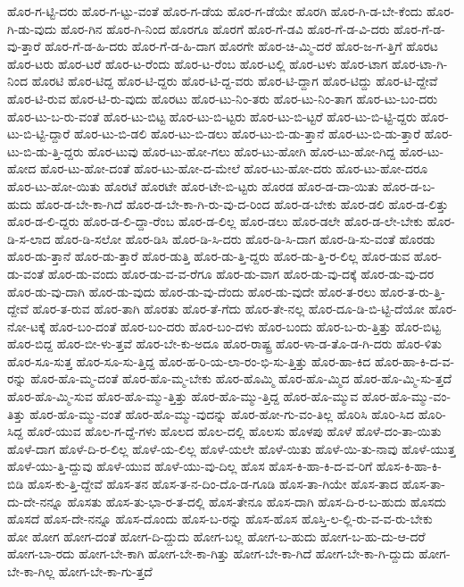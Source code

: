 {ಹೊರ-ಗ-ಟ್ಟಿ-ದರು
ಹೊರ-ಗ-ಟ್ಟು-ವಂತೆ
ಹೊರ-ಗ-ಡೆಯ
ಹೊರ-ಗ-ಡೆಯೇ
ಹೊರಗಿ
ಹೊರ-ಗಿ-ಡ-ಬೇ-ಕೆಂದು
ಹೊರ-ಗಿ-ಡು-ವುದು
ಹೊರ-ಗಿನ
ಹೊರ-ಗಿ-ನಿಂದ
ಹೊರಗೂ
ಹೊರಗೆ
ಹೊರ-ಗೆ-ಡವಿ
ಹೊರ-ಗೆ-ಡ-ವಿ-ದರು
ಹೊರ-ಗೆ-ಡ-ವು-ತ್ತಾರೆ
ಹೊರ-ಗೆ-ಡ-ಹಿ-ದರು
ಹೊರ-ಗೆ-ಡ-ಹಿ-ದಾಗ
ಹೊರಗೇ
ಹೊರ-ಚಿ-ಮ್ಮಿ-ದರೆ
ಹೊರ-ಜ-ಗ-ತ್ತಿಗೆ
ಹೊರಟ
ಹೊರ-ಟರು
ಹೊರ-ಟರೆ
ಹೊರ-ಟ-ರೆಂದು
ಹೊರ-ಟ-ರೆಂಬ
ಹೊರ-ಟಲ್ಲಿ
ಹೊರ-ಟಳು
ಹೊರ-ಟಾಗ
ಹೊರ-ಟಾ-ಗಿ-ನಿಂದ
ಹೊರಟಿ
ಹೊರ-ಟಿದ್ದ
ಹೊರ-ಟಿ-ದ್ದರು
ಹೊರ-ಟಿ-ದ್ದ-ವರು
ಹೊರ-ಟಿ-ದ್ದಾಗ
ಹೊರ-ಟಿದ್ದು
ಹೊರ-ಟಿ-ದ್ದೇವೆ
ಹೊರ-ಟಿ-ರುವ
ಹೊರ-ಟಿ-ರು-ವುದು
ಹೊರಟು
ಹೊರ-ಟು-ನಿಂ-ತರು
ಹೊರ-ಟು-ನಿಂ-ತಾಗ
ಹೊರ-ಟು-ಬಂ-ದರು
ಹೊರ-ಟು-ಬ-ರು-ವಂತೆ
ಹೊರ-ಟು-ಬಿಟ್ಟ
ಹೊರ-ಟು-ಬಿ-ಟ್ಟರು
ಹೊರ-ಟು-ಬಿ-ಟ್ಟರೆ
ಹೊರ-ಟು-ಬಿ-ಟ್ಟಿ-ದ್ದರು
ಹೊರ-ಟು-ಬಿ-ಟ್ಟಿ-ದ್ದಾರೆ
ಹೊರ-ಟು-ಬಿ-ಡಲಿ
ಹೊರ-ಟು-ಬಿ-ಡಲು
ಹೊರ-ಟು-ಬಿ-ಡು-ತ್ತಾನೆ
ಹೊರ-ಟು-ಬಿ-ಡು-ತ್ತಾರೆ
ಹೊರ-ಟು-ಬಿ-ಡು-ತ್ತಿ-ದ್ದರು
ಹೊರ-ಟುವು
ಹೊರ-ಟು-ಹೋ-ಗಲು
ಹೊರ-ಟು-ಹೋಗಿ
ಹೊರ-ಟು-ಹೋ-ಗಿದ್ದ
ಹೊರ-ಟು-ಹೋದ
ಹೊರ-ಟು-ಹೋ-ದಂತೆ
ಹೊರ-ಟು-ಹೋ-ದ-ಮೇಲೆ
ಹೊರ-ಟು-ಹೋ-ದರು
ಹೊರ-ಟು-ಹೋ-ದರೂ
ಹೊರ-ಟು-ಹೋ-ಯಿತು
ಹೊರಟೆ
ಹೊರಟೇ
ಹೊರ-ಟೇ-ಬಿ-ಟ್ಟರು
ಹೊರಡ
ಹೊರ-ಡ-ದಾ-ಯಿತು
ಹೊರ-ಡ-ಬ-ಹುದು
ಹೊರ-ಡ-ಬೇ-ಕಾ-ಗಿದೆ
ಹೊರ-ಡ-ಬೇ-ಕಾ-ಗಿ-ರು-ವು-ದ-ರಿಂದ
ಹೊರ-ಡ-ಬೇಕು
ಹೊರ-ಡಲಿ
ಹೊರ-ಡ-ಲಿತ್ತು
ಹೊರ-ಡ-ಲಿ-ದ್ದರು
ಹೊರ-ಡ-ಲಿ-ದ್ದಾ-ರೆಂಬ
ಹೊರ-ಡ-ಲಿಲ್ಲ
ಹೊರ-ಡಲು
ಹೊರ-ಡಲೇ
ಹೊರ-ಡ-ಲೇ-ಬೇಕು
ಹೊರ-ಡಿ-ಸ-ಲಾದ
ಹೊರ-ಡಿ-ಸಲೋ
ಹೊರ-ಡಿಸಿ
ಹೊರ-ಡಿ-ಸಿ-ದರು
ಹೊರ-ಡಿ-ಸಿ-ದಾಗ
ಹೊರ-ಡಿ-ಸು-ವಂತೆ
ಹೊರಡು
ಹೊರ-ಡು-ತ್ತಾನೆ
ಹೊರ-ಡು-ತ್ತಾರೆ
ಹೊರ-ಡುತ್ತಿ
ಹೊರ-ಡು-ತ್ತಿ-ದ್ದರು
ಹೊರ-ಡು-ತ್ತಿ-ರ-ಲಿಲ್ಲ
ಹೊರ-ಡುವ
ಹೊರ-ಡು-ವಂತೆ
ಹೊರ-ಡು-ವಂದು
ಹೊರ-ಡು-ವ-ವ-ರೆಗೂ
ಹೊರ-ಡು-ವಾಗ
ಹೊರ-ಡು-ವು-ದಕ್ಕೆ
ಹೊರ-ಡು-ವು-ದರ
ಹೊರ-ಡು-ವು-ದಾಗಿ
ಹೊರ-ಡು-ವುದು
ಹೊರ-ಡು-ವು-ದೆಂದು
ಹೊರ-ಡು-ವುದೇ
ಹೊರ-ತ-ರಲು
ಹೊರ-ತ-ರು-ತ್ತಿ-ದ್ದೇವೆ
ಹೊರ-ತ-ರುವ
ಹೊರ-ತಾಗಿ
ಹೊರತು
ಹೊರ-ತೆ-ಗೆದು
ಹೊರ-ತೇ-ನಲ್ಲ
ಹೊರ-ದೂ-ಡಿ-ಬಿ-ಟ್ಟಿ-ದೆಯೋ
ಹೊರ-ನೋ-ಟಕ್ಕೆ
ಹೊರ-ಬಂ-ದಂತೆ
ಹೊರ-ಬಂ-ದರು
ಹೊರ-ಬಂ-ದಳು
ಹೊರ-ಬಂದು
ಹೊರ-ಬ-ರು-ತ್ತಿತ್ತು
ಹೊರ-ಬಿಟ್ಟ
ಹೊರ-ಬಿದ್ದ
ಹೊರ-ಬೀ-ಳು-ತ್ತವೆ
ಹೊರ-ಬೇ-ಕು-ಅದೂ
ಹೊರ-ರಾಷ್ಟ್ರ
ಹೊರ-ಳಾ-ಡ-ತೊ-ಡ-ಗಿ-ದರು
ಹೊರ-ಳಿತು
ಹೊರ-ಸೂ-ಸುತ್ತ
ಹೊರ-ಸೂ-ಸು-ತ್ತಿದ್ದ
ಹೊರ-ಹ-ರಿ-ಯ-ಲಾ-ರಂ-ಭಿ-ಸು-ತ್ತಿತ್ತು
ಹೊರ-ಹಾ-ಕಿದ
ಹೊರ-ಹಾ-ಕಿ-ದ-ವ-ರನ್ನು
ಹೊರ-ಹೊ-ಮ್ಮ-ದಂತೆ
ಹೊರ-ಹೊ-ಮ್ಮ-ಬೇಕು
ಹೊರ-ಹೊಮ್ಮಿ
ಹೊರ-ಹೊ-ಮ್ಮಿದ
ಹೊರ-ಹೊ-ಮ್ಮಿ-ಸು-ತ್ತದೆ
ಹೊರ-ಹೊ-ಮ್ಮಿ-ಸುವ
ಹೊರ-ಹೊ-ಮ್ಮು-ತ್ತಿತ್ತು
ಹೊರ-ಹೊ-ಮ್ಮು-ತ್ತಿದ್ದ
ಹೊರ-ಹೊ-ಮ್ಮುವ
ಹೊರ-ಹೊ-ಮ್ಮು-ವಂ-ತಿತ್ತು
ಹೊರ-ಹೊ-ಮ್ಮು-ವಂತೆ
ಹೊರ-ಹೊ-ಮ್ಮು-ವುದನ್ನು
ಹೊರ-ಹೋ-ಗು-ವಂ-ತಿಲ್ಲ
ಹೊರಿಸಿ
ಹೊರಿ-ಸಿದ
ಹೊರಿ-ಸಿದ್ದ
ಹೊರೆ-ಯುವ
ಹೊಲ-ಗ-ದ್ದೆ-ಗಳು
ಹೊಲದ
ಹೊಲ-ದಲ್ಲಿ
ಹೊಲಸು
ಹೊಳಪು
ಹೊಳೆ
ಹೊಳೆ-ದಂ-ತಾ-ಯಿತು
ಹೊಳೆ-ದಾಗ
ಹೊಳೆ-ದಿ-ರ-ಲಿಲ್ಲ
ಹೊಳೆ-ಯ-ಲಿಲ್ಲ
ಹೊಳೆ-ಯಲೇ
ಹೊಳೆ-ಯಿತು
ಹೊಳೆ-ಯಿ-ತು-ನಾವು
ಹೊಳೆ-ಯುತ್ತ
ಹೊಳೆ-ಯು-ತ್ತಿ-ದ್ದುವು
ಹೊಳೆ-ಯುವ
ಹೊಳೆ-ಯು-ವು-ದಿಲ್ಲ
ಹೊಸ
ಹೊಸ-ಕಿ-ಹಾ-ಕಿ-ದ-ವ-ರಿಗೆ
ಹೊಸ-ಕಿ-ಹಾ-ಕಿ-ಬಿಡಿ
ಹೊಸ-ಕು-ತ್ತಿ-ದ್ದೇವೆ
ಹೊಸ-ತನ
ಹೊಸ-ತ-ನ-ದಿಂ-ದೊ-ಡ-ಗೂಡಿ
ಹೊಸ-ತಾ-ಗಿಯೇ
ಹೊಸ-ತಾದ
ಹೊಸ-ತಾ-ದು-ದೇ-ನನ್ನೂ
ಹೊಸತು
ಹೊಸ-ತು-ಭಾ-ರ-ತ-ದಲ್ಲಿ
ಹೊಸ-ತೇನೂ
ಹೊಸ-ದಾಗಿ
ಹೊಸ-ದಿ-ರ-ಬ-ಹುದು
ಹೊಸದು
ಹೊಸದೆ
ಹೊಸ-ದೇ-ನನ್ನೂ
ಹೊಸ-ದೊಂದು
ಹೊಸ-ಬ-ರನ್ನು
ಹೊಸ-ಹೊಸ
ಹೊಸ್ತಿ-ಲ-ಲ್ಲಿ-ರು-ವ-ವ-ರು-ಬೇಕು
ಹೋ
ಹೋಗ
ಹೋಗ-ದಂತೆ
ಹೋಗ-ದಿ-ದ್ದುದು
ಹೋಗ-ಬಲ್ಲ
ಹೋಗ-ಬ-ಹುದು
ಹೋಗ-ಬ-ಹು-ದು-ಆ-ದರೆ
ಹೋಗ-ಬಾ-ರದು
ಹೋಗ-ಬೇ-ಕಾಗಿ
ಹೋಗ-ಬೇ-ಕಾ-ಗಿತ್ತು
ಹೋಗ-ಬೇ-ಕಾ-ಗಿದೆ
ಹೋಗ-ಬೇ-ಕಾ-ಗಿ-ದ್ದುದು
ಹೋಗ-ಬೇ-ಕಾ-ಗಿಲ್ಲ
ಹೋಗ-ಬೇ-ಕಾ-ಗು-ತ್ತದೆ
}
